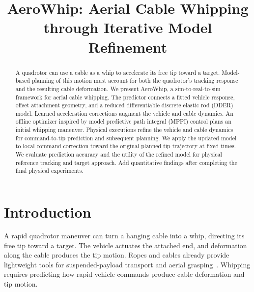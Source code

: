 \documentclass[letterpaper, 10 pt, conference]{ieeeconf}
\newcommand{\Tony}[1]{{\color{orange}#1}}
\begin{document}


\title{\bf AeroWhip: Aerial Cable Whipping through Iterative Model Refinement}


\maketitle

\begin{abstract}
A quadrotor can use a cable as a whip to accelerate its free tip
toward a target. Model-based planning of this motion must account
for both the quadrotor's tracking response and the resulting cable
deformation. We present AeroWhip, a sim-to-real-to-sim framework
for aerial cable whipping. The predictor connects a fitted vehicle response, offset attachment
geometry, and a reduced differentiable discrete elastic rod (DDER)
model. Learned acceleration corrections augment the vehicle and
cable dynamics.
An offline optimizer inspired by model predictive path integral
(MPPI) control plans an initial whipping maneuver. Physical
executions refine the vehicle and cable dynamics for command-to-tip
prediction and subsequent planning. We apply the updated model to
local command correction toward the original planned tip trajectory
at fixed times.
We evaluate prediction accuracy and the utility of the refined
model for physical reference tracking and target approach.
\Tony{Add quantitative findings after completing the final physical experiments.}
\end{abstract}

\IEEEpeerreviewmaketitle


\section{Introduction}
\label{sec:introduction}

A rapid quadrotor maneuver can turn a hanging cable into a whip,
directing its free tip toward a target. The vehicle actuates the
attached end, and deformation along the cable produces the tip
motion. Ropes and cables already provide lightweight tools for
suspended-payload transport and aerial
grasping~\cite{sreenath2013trajectory,hitch}. Whipping requires
predicting how rapid vehicle commands produce cable deformation
and tip motion.
\end{document}
